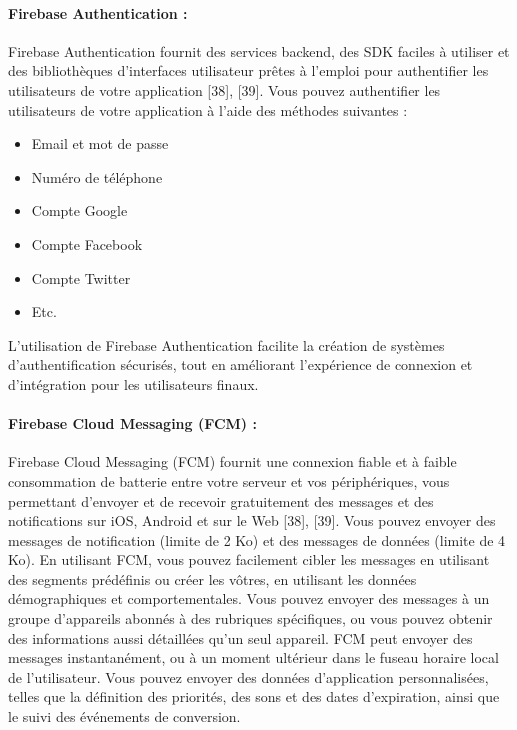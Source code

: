 \paragraph{Firebase Authentication :\newline}
Firebase Authentication fournit des services backend, des SDK faciles à utiliser et des
bibliothèques d'interfaces utilisateur prêtes à l'emploi pour authentifier les utilisateurs de votre
application [38], [39].
Vous pouvez authentifier les utilisateurs de votre application à l'aide des méthodes suivantes :
\begin{itemize}[label=$\ast$]
	\item Email et mot de passe
	\item Numéro de téléphone
	\item Compte Google
	\item Compte Facebook
	\item Compte Twitter
	\item Etc.
\end{itemize}
L'utilisation de Firebase Authentication facilite la création de systèmes d'authentification
sécurisés, tout en améliorant l'expérience de connexion et d'intégration pour les utilisateurs
finaux.
\paragraph{Firebase Cloud Messaging (FCM) :\newline}
Firebase Cloud Messaging (FCM) fournit une connexion fiable et à faible consommation de
batterie entre votre serveur et vos périphériques, vous permettant d'envoyer et de recevoir
gratuitement des messages et des notifications sur iOS, Android et sur le Web [38], [39]. Vous
pouvez envoyer des messages de notification (limite de 2 Ko) et des messages de données
(limite de 4 Ko).
En utilisant FCM, vous pouvez facilement cibler les messages en utilisant des segments
prédéfinis ou créer les vôtres, en utilisant les données démographiques et comportementales.
Vous pouvez envoyer des messages à un groupe d'appareils abonnés à des rubriques
spécifiques, ou vous pouvez obtenir des informations aussi détaillées qu'un seul appareil.
FCM peut envoyer des messages instantanément, ou à un moment ultérieur dans le fuseau
horaire local de l'utilisateur. Vous pouvez envoyer des données d'application personnalisées,
telles que la définition des priorités, des sons et des dates d'expiration, ainsi que le suivi des
événements de conversion.
